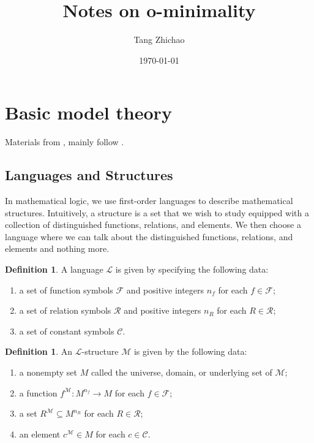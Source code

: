 \documentclass{amsart}
\title{Notes on o-minimality}
\author{Tang Zhichao}
\date{\today}
\theoremstyle{definition}
\newtheorem{definition}[theorem]{Definition}
\numberwithin{equation}{section}
\begin{document}
\maketitle

\section{Basic model theory}
Materials from \cite{zbMATH01821671,zbMATH01160037},
mainly follow \cite{zbMATH01821671}.
\subsection{Languages and Structures}
In mathematical logic, 
we use first-order languages to describe mathematical structures. 
Intuitively, a structure is a set that we wish to study equipped with a collection of distinguished functions, relations, and elements. 
We then choose a language where we can talk about the distinguished functions, relations, and elements and nothing more.

\begin{definition}
A language $\mathcal{L}$ is given by specifying the following data:
\begin{enumerate}[label = {(\roman*)}]
    \item a set of function symbols $\mathcal{F}$ and positive integers $n_f$ for each $f \in \mathcal{F}$;
    \item a set of relation symbols $\mathcal{R}$ and positive integers $n_R$ for each $R \in \mathcal{R}$;
    \item a set of constant symbols $\mathcal{C}$.
\end{enumerate}
\end{definition}

\begin{definition}
An $\mathcal{L}$-structure $\mathcal{M}$ is given by the following data:
    \begin{enumerate}[label = {(\roman*)}]
    \item a nonempty set $M$ called the universe, domain, or underlying set of $\mathcal{M}$;
    \item a function $f^{\mathcal{M}} : M^{n_f} \to M$ for each $f \in \mathcal{F}$;
    \item a set $R^{\mathcal{M}} \subseteq M^{n_R}$ for each $R \in \mathcal{R}$;
    \item an element $c^{\mathcal{M}} \in M$ for each $c \in \mathcal{C}$.
    \end{enumerate}
\end{definition}
\end{document}
